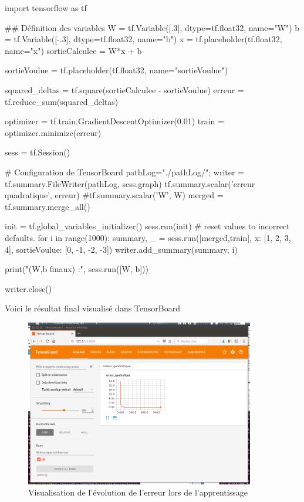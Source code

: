 \documentclass[a4paper,11pt]{book}
\theoremstyle{theo}
\begin{document}
\begin{mypython}
import tensorflow as tf

## Définition des variables 
W = tf.Variable([.3], dtype=tf.float32, name="W")
b = tf.Variable([-.3], dtype=tf.float32, name="b")
x = tf.placeholder(tf.float32, name="x")
sortieCalculee = W*x + b

sortieVoulue = tf.placeholder(tf.float32, name="sortieVoulue")

squared_deltas = tf.square(sortieCalculee - sortieVoulue)
erreur = tf.reduce_sum(squared_deltas)


optimizer = tf.train.GradientDescentOptimizer(0.01)
train = optimizer.minimize(erreur)

sess = tf.Session()

# Configuration de TensorBoard
pathLog="./pathLog/";
writer = tf.summary.FileWriter(pathLog, sess.graph)
tf.summary.scalar('erreur quadratique', erreur)
#tf.summary.scalar('W', W)
merged = tf.summary.merge_all()

init = tf.global_variables_initializer()
sess.run(init) # reset values to incorrect defaults.
for i in range(1000):
  summary, _ = sess.run([merged,train], {x: [1, 2, 3, 4], sortieVoulue: [0, -1, -2, -3]})
  writer.add_summary(summary, i)
  
print("(W,b finaux) :", sess.run([W, b]))


writer.close()
\end{mypython}

Voici le résultat final visualisé dans TensorBoard
\begin{figure}[H]

\begin{center}
\includegraphics[width=10cm]{./figures/TBScalarRegression.png} 
\end{center}
\caption{Visualisation de l'évolution de l'erreur lors de l'apprentissage}
\end{figure}
\end{document}
